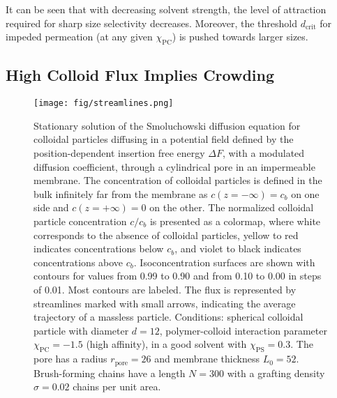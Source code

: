 \documentclass[12pt, a4paper]{article}
\begin{document}
It can be seen that with decreasing solvent strength, the level of attraction required for sharp size selectivity decreases. 
Moreover, the threshold $d_{\text{crit}}$ for impeded permeation (at any given $\chi_{\text{PC}}$) is pushed towards larger sizes.


\subsection{High Colloid Flux Implies Crowding}

\begin{figure}
    \centering
    \texttt{[image: fig/streamlines.png]}
    \caption{
    Stationary solution of the Smoluchowski diffusion equation for colloidal particles diffusing in a potential field defined by the position-dependent insertion free energy $\Delta F$, with a modulated diffusion coefficient, through a cylindrical pore in an impermeable membrane.
    The concentration of colloidal particles is defined in the bulk infinitely far from the membrane as $c(z = -\infty) = c_{b}$ on one side and $c(z = +\infty) = 0$ on the other.
    The normalized colloidal particle concentration $c / c_{b}$ is presented as a colormap, where white corresponds to the absence of colloidal particles, yellow to red indicates concentrations below $c_{b}$, and violet to black indicates concentrations above $c_{b}$.
    Isoconcentration surfaces are shown with contours for values from 0.99 to 0.90 and from 0.10 to 0.00 in steps of 0.01.
    Most contours are labeled.
    The flux is represented by streamlines marked with small arrows, indicating the average trajectory of a massless particle.
    Conditions: spherical colloidal particle with diameter $d = 12$, polymer-colloid interaction parameter $\chi_{\text{PC}} = -1.5$ (high affinity), in a good solvent with $\chi_{\text{PS}} = 0.3$.
    The pore has a radius $r_{\text{pore}} = 26$ and membrane thickness $L_{0} = 52$.
    Brush-forming chains have a length $N = 300$ with a grafting density $\sigma = 0.02$ chains per unit area.
    }
    \label{fig:colloid_concentration}
\end{figure}
\end{document}
